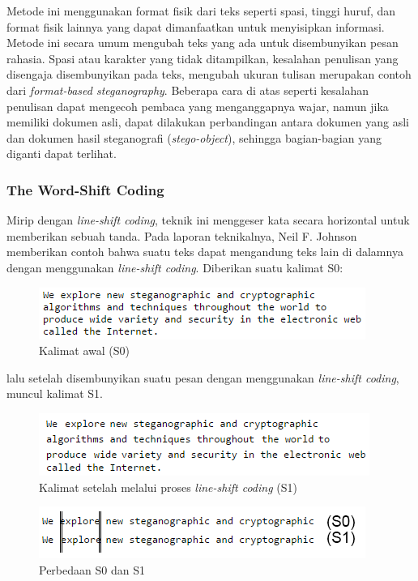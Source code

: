 Metode ini menggunakan format fisik dari teks seperti spasi, tinggi huruf, dan format fisik lainnya yang dapat dimanfaatkan untuk menyisipkan informasi. Metode ini secara umum mengubah teks yang ada untuk disembunyikan pesan rahasia. Spasi atau karakter yang tidak ditampilkan, kesalahan penulisan yang disengaja disembunyikan pada teks, mengubah ukuran tulisan merupakan contoh dari \textit{format-based steganography}. Beberapa cara di atas seperti kesalahan penulisan dapat mengecoh pembaca yang menganggapnya wajar, namun jika memiliki dokumen asli, dapat dilakukan perbandingan antara dokumen yang asli dan dokumen hasil steganografi (\textit{stego-object}), sehingga bagian-bagian yang diganti dapat terlihat.

\subsubsection{The Word-Shift Coding}

Mirip dengan \textit{line-shift coding}, teknik ini menggeser kata secara horizontal untuk memberikan sebuah tanda. Pada laporan teknikalnya, Neil F. Johnson memberikan contoh bahwa suatu teks dapat mengandung teks lain di dalamnya dengan menggunakan \textit{line-shift coding}\cite{Neil:1995}. Diberikan suatu kalimat S0:
\begin{figure}[H]
	\centering
	\includegraphics[scale=0.8]{Gambar/S0}
	\caption{Kalimat awal (S0)} 
\end{figure}

lalu setelah disembunyikan suatu pesan dengan menggunakan \textit{line-shift coding}, muncul kalimat S1.

\begin{figure}[H]
	\centering
	\includegraphics[scale=0.8]{Gambar/S1}
	\caption{Kalimat setelah melalui proses \textit{line-shift coding} (S1)}
\end{figure}

\begin{figure}[H]
	\centering
	\includegraphics[scale=1.6]{Gambar/perbandingan-s0-s1}
	\caption{Perbedaan S0 dan S1}
\end{figure}

